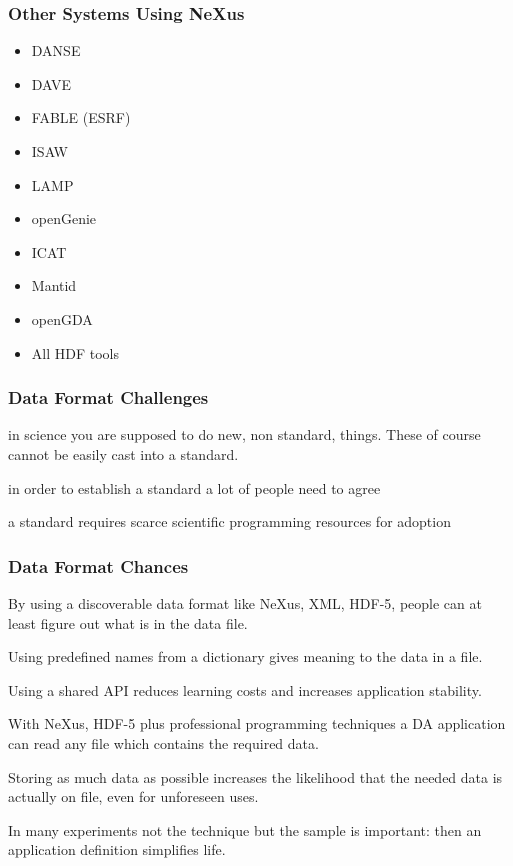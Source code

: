 \documentclass{beamer}
\begin{document}
\begin{frame} \frametitle{Other Systems Using NeXus}
\begin{itemize}
\item DANSE
\item DAVE
\item FABLE (ESRF)
\item ISAW
\item LAMP
\item openGenie
\item ICAT
\item Mantid
\item openGDA
\item All HDF tools
\end{itemize}
\end{frame}

\begin{frame} \frametitle{Data Format Challenges}
\begin{description}
\item<1->[Challenge 1] in science you are supposed to do new, non standard, things.  
 These of course cannot be easily cast into a standard.
\item<2->[Challenge 2] in order to establish a standard a lot of people need to agree
\item<3->[Challenge 3] a standard requires scarce scientific  programming resources for adoption 
\end{description}
\end{frame}

\begin{frame} \frametitle{Data Format Chances}
\begin{description}
\item<1->[Chance 1] By using a discoverable data format like NeXus, XML, HDF-5, people can at 
 least figure out  what is in the data file. 
\item<2->[Chance 2] Using predefined names from a dictionary gives meaning to the data in a file.
\item<3->[Chance 3] Using a shared API reduces learning costs and increases application stability.
\item<4->[Chance 4] With NeXus, HDF-5 plus professional programming techniques a DA application can 
 read any file which contains the required data.
\item<5->[Chance 5] Storing as much data as possible increases the likelihood that the needed 
 data is actually on file, even for unforeseen uses. 
\item<6->[Chance 6] In many experiments not the technique but the sample is important: 
 then an application definition simplifies life.  
\end{description}
\end{frame}
\end{document}
